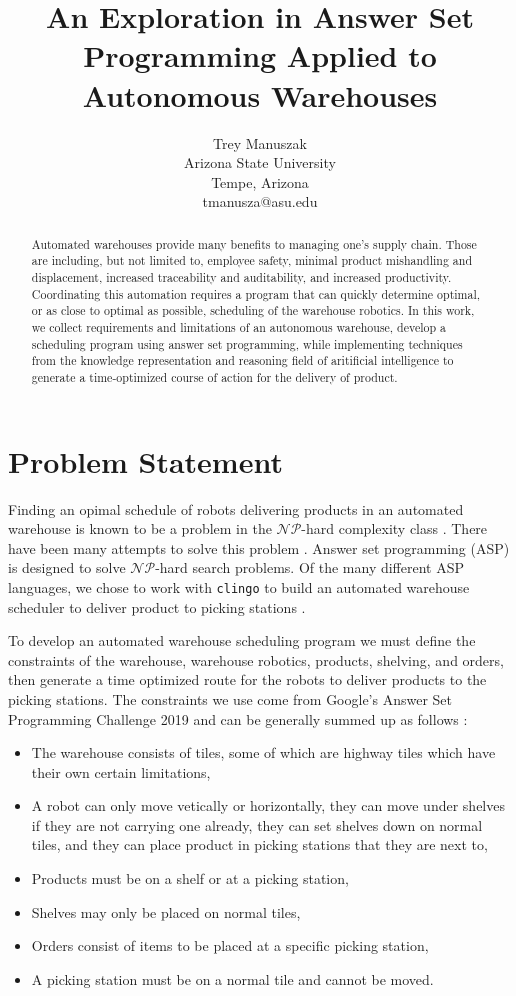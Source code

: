 \documentclass[letterpaper]{article} %
\title{An Exploration in Answer Set Programming Applied to Autonomous Warehouses}
\author{Trey Manuszak\\
Arizona State University\\ %
Tempe, Arizona\\
tmanusza@asu.edu %
}
\begin{document}
\maketitle

\begin{abstract}
Automated warehouses provide many benefits to managing one's supply chain. Those are including, but not limited to, employee safety, minimal product mishandling and displacement, increased traceability and auditability, and increased productivity. Coordinating this automation requires a program that can quickly determine optimal, or as close to optimal as possible, scheduling of the warehouse robotics. In this work, we collect requirements and limitations of an autonomous warehouse, develop a scheduling program using answer set programming, while implementing techniques from the knowledge representation and reasoning field of aritificial intelligence to generate a time-optimized course of action for the delivery of product.
\end{abstract}

\section{Problem Statement}
Finding an opimal schedule of robots delivering products in an automated warehouse is known to be a problem in the $\mathcal{NP}$-hard complexity class \cite{LENSTRA1977343}. There have been many attempts to solve this problem . Answer set programming (ASP) is designed to solve $\mathcal{NP}$-hard search problems. Of the many different ASP languages, we chose to work with \texttt{clingo} to build an automated warehouse scheduler to deliver product to picking stations \cite{clingo}.

To develop an automated warehouse scheduling program we must define the constraints of the warehouse, warehouse robotics, products, shelving, and orders, then generate a time optimized route for the robots to deliver products to the picking stations. The constraints we use come from Google's Answer Set Programming Challenge 2019 and can be generally summed up as follows \cite{gasp}:

\begin{itemize}
\item The warehouse consists of tiles, some of which are highway tiles which have their own certain limitations,
\item A robot can only move vetically or horizontally, they can move under shelves if they are not carrying one already, they can set shelves down on normal tiles, and they can place product in picking stations that they are next to,
\item Products must be on a shelf or at a picking station,
\item Shelves may only be placed on normal tiles,
\item Orders consist of items to be placed at a specific picking station,
\item A picking station must be on a normal tile and cannot be moved.
\end{itemize}
\end{document}
